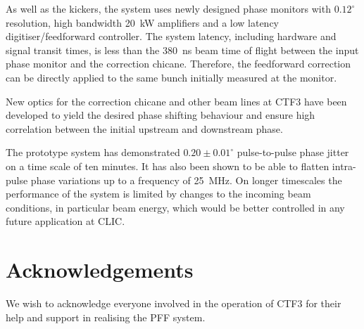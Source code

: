 \documentclass[%
 reprint,
superscriptaddress,
 amsmath,amssymb,
 prl,
]{revtex4-1}
\begin{document}
As 
well as the kickers, the system uses newly designed phase monitors with 
\(0.12^\circ\) resolution, high bandwidth 20~kW amplifiers and a low latency 
digitiser/feedforward controller. The system latency, including hardware and 
signal transit times, is less than the 380~ns beam time of flight between the 
input phase monitor and the correction chicane. Therefore, the feedforward 
correction can 
be directly applied to the same bunch initially measured at the monitor.

New optics for the correction chicane and other beam lines at CTF3 have been 
developed to yield the desired phase shifting behaviour and ensure high 
correlation between the initial upstream and downstream phase.

The prototype system has demonstrated \(0.20\pm0.01^\circ\) pulse-to-pulse 
phase jitter on a time scale of ten minutes. It has also been shown to be able 
to flatten intra-pulse phase variations up to a frequency of 25~MHz. On longer 
timescales the performance of the system is limited by changes to the incoming 
beam conditions, in particular beam energy, which would be better controlled in 
any future application at CLIC.



\section{\label{s:ack}Acknowledgements}
\begin{acknowledgments}
	We wish to acknowledge everyone involved in the operation of CTF3 for their 
	help and support in realising the PFF system.
\end{acknowledgments}

\end{document}
